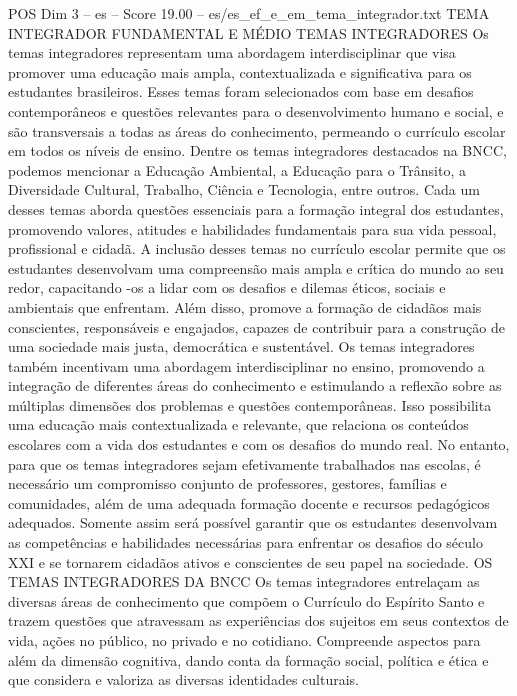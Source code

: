\begin{textsample}{POS Dim 3 – es – Score 19.00 – es/es\_ef\_e\_em\_tema\_integrador.txt}  \label{ex:f3_pos_117}
TEMA INTEGRADOR FUNDAMENTAL E MÉDIO TEMAS INTEGRADORES Os temas integradores representam uma abordagem interdisciplinar que visa promover uma educação mais ampla, contextualizada e significativa para os estudantes brasileiros.
Esses temas foram selecionados com base em desafios contemporâneos e questões relevantes para o desenvolvimento humano e social, e são transversais a todas as áreas do conhecimento, permeando o currículo escolar em todos os níveis de ensino.
Dentre os temas integradores destacados na BNCC, podemos mencionar a Educação Ambiental, a Educação para o Trânsito, a Diversidade Cultural, Trabalho, Ciência e Tecnologia, entre outros.
Cada um desses temas aborda questões essenciais para a formação integral dos estudantes, promovendo valores, atitudes e habilidades fundamentais para sua vida pessoal, profissional e cidadã.
A inclusão desses temas no currículo escolar permite que os estudantes desenvolvam uma compreensão mais ampla e crítica do mundo ao seu redor, capacitando -os a lidar com os desafios e dilemas éticos, sociais e ambientais que enfrentam.
Além disso, promove a formação de cidadãos mais conscientes, responsáveis e engajados, capazes de contribuir para a construção de uma sociedade mais justa, democrática e sustentável.
Os temas integradores também incentivam uma abordagem interdisciplinar no ensino, promovendo a integração de diferentes áreas do conhecimento e estimulando a reflexão sobre as múltiplas dimensões dos problemas e questões contemporâneas.
Isso possibilita uma educação mais contextualizada e relevante, que relaciona os conteúdos escolares com a vida dos estudantes e com os desafios do mundo real.
No entanto, para que os temas integradores sejam efetivamente trabalhados nas escolas, é necessário um compromisso conjunto de professores, gestores, famílias e comunidades, além de uma adequada formação docente e recursos pedagógicos adequados.
Somente assim será possível garantir que os estudantes desenvolvam as competências e habilidades necessárias para enfrentar os desafios do século XXI e se tornarem cidadãos ativos e conscientes de seu papel na sociedade.
OS TEMAS INTEGRADORES DA BNCC Os temas integradores entrelaçam as diversas áreas de conhecimento que compõem o Currículo do Espírito Santo e trazem questões que atravessam as experiências dos sujeitos em seus contextos de vida, ações no público, no privado e no cotidiano.
Compreende aspectos para além da dimensão cognitiva, dando conta da formação social, política e ética e que considera e valoriza as diversas identidades culturais.

\end{textsample}

